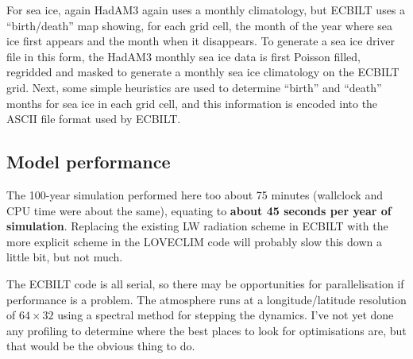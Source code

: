 \documentclass[a4paper,11pt,article]{article}
\begin{document}
For sea ice, again HadAM3 again uses a monthly climatology, but ECBILT
uses a ``birth/death'' map showing, for each grid cell, the month of
the year where sea ice first appears and the month when it disappears.
To generate a sea ice driver file in this form, the HadAM3 monthly sea
ice data is first Poisson filled, regridded and masked to generate a
monthly sea ice climatology on the ECBILT grid.  Next, some simple
heuristics are used to determine ``birth'' and ``death'' months for
sea ice in each grid cell, and this information is encoded into the
ASCII file format used by ECBILT.




\subsection{Model performance}

The 100-year simulation performed here too about 75 minutes (wallclock
and CPU time were about the same), equating to \textbf{about 45
  seconds per year of simulation}.  Replacing the existing LW
radiation scheme in ECBILT with the more explicit scheme in the
LOVECLIM code will probably slow this down a little bit, but not much.

The ECBILT code is all serial, so there may be opportunities for
parallelisation if performance is a problem.  The atmosphere runs at a
longitude/latitude resolution of $64 \times 32$ using a spectral
method for stepping the dynamics.  I've not yet done any profiling to
determine where the best places to look for optimisations are, but
that would be the obvious thing to do.

\end{document}
